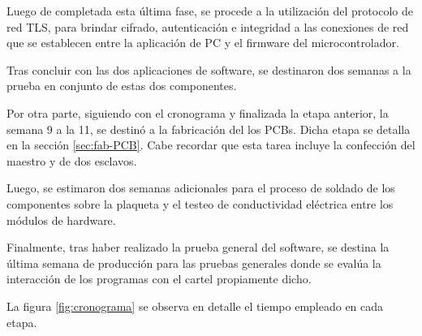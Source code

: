 Luego de completada esta última fase, se procede a la utilización del protocolo de red TLS, para brindar cifrado, autenticación e integridad a las conexiones de red que se establecen entre la aplicación de PC y el firmware del microcontrolador.

Tras concluir con las dos aplicaciones de software, se destinaron dos semanas a la prueba en conjunto de estas dos componentes.

Por otra parte, siguiendo con el cronograma y finalizada la etapa anterior, la semana 9 a la 11, se destinó a la fabricación del los PCBs. Dicha etapa se detalla en la sección \ref{sec:fab-PCB}. Cabe recordar que esta tarea incluye la confección del maestro y de dos esclavos.

Luego, se estimaron dos semanas adicionales para el proceso de soldado de los componentes sobre la plaqueta y el testeo de conductividad eléctrica entre los módulos de hardware.

Finalmente, tras haber realizado la prueba general del software, se destina la última semana de producción para las pruebas generales donde se evalúa la interacción de los programas con el cartel propiamente dicho.

La figura \ref{fig:cronograma} se observa en detalle el tiempo empleado en cada etapa.

